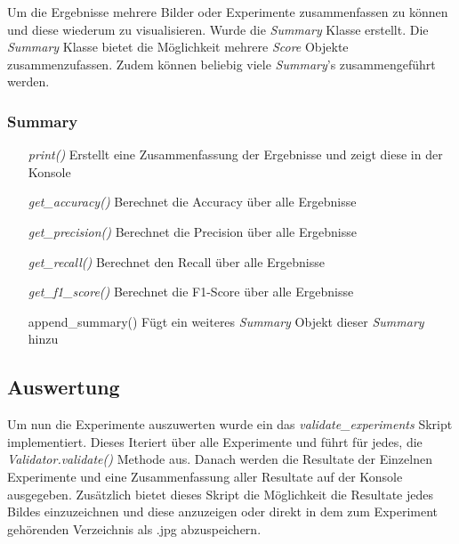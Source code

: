 \noindent
Um die Ergebnisse mehrere Bilder oder Experimente zusammenfassen zu können und diese wiederum zu visualisieren. Wurde die \textit{Summary} Klasse erstellt. Die \textit{Summary} Klasse bietet die Möglichkeit mehrere \textit{Score} Objekte zusammenzufassen. Zudem können beliebig viele \textit{Summary}'s zusammengeführt werden.

\subsubsection{Summary}

\begin{itemize}[leftmargin=*,labelindent=3cm, labelsep=1cm]
	\item[\textit{print()}] Erstellt eine Zusammenfassung der Ergebnisse und zeigt diese in der Konsole
	\item[\textit{get\_accuracy()}] Berechnet die Accuracy über alle Ergebnisse
	\item[\textit{get\_precision()}] Berechnet die Precision über alle Ergebnisse
	\item[\textit{get\_recall()}] Berechnet den Recall über alle Ergebnisse
	\item[\textit{get\_f1\_score()}] Berechnet die F1-Score über alle Ergebnisse
	\item[append\_summary()] Fügt ein weiteres \textit{Summary} Objekt dieser \textit{Summary} hinzu
\end{itemize}

\subsection{Auswertung}

Um nun die Experimente auszuwerten wurde ein das \textit{validate\_experiments} Skript implementiert. Dieses Iteriert über alle Experimente und führt für jedes, die \textit{Validator.validate()} Methode aus. Danach werden die Resultate der Einzelnen Experimente und eine Zusammenfassung aller Resultate auf der Konsole ausgegeben. Zusätzlich bietet dieses Skript die Möglichkeit die Resultate jedes Bildes einzuzeichnen und diese anzuzeigen oder direkt in dem zum Experiment gehörenden Verzeichnis als .jpg abzuspeichern.

